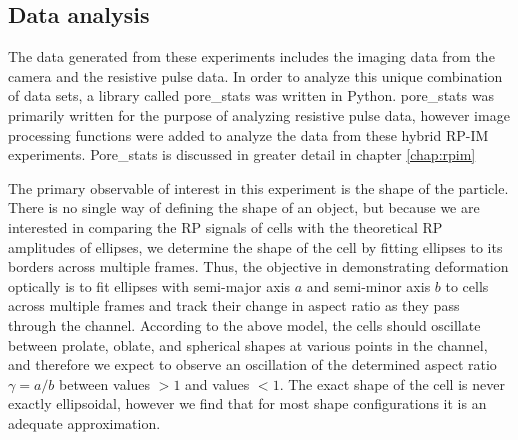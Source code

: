 		
		
		\subsection{Data analysis}
			
			The data generated from these experiments includes the imaging data from the camera and the resistive pulse data. In order to analyze this unique combination of data sets, a library called pore\_stats was written in Python. pore\_stats was primarily written for the purpose of analyzing resistive pulse data, however image processing functions were added to analyze the data from these hybrid RP-IM experiments. Pore\_stats is discussed in greater detail in chapter \ref{chap:rpim}
			
			The primary observable of interest in this experiment is the shape of the particle. There is no single way of defining the shape of an object, but because we are interested in comparing the RP signals of cells with the theoretical RP amplitudes of ellipses, we determine the shape of the cell by fitting ellipses to its borders across multiple frames. Thus, the objective in demonstrating deformation optically is to fit ellipses with semi-major axis $a$ and semi-minor axis $b$ to cells across multiple frames and track their change in aspect ratio as they pass through the channel. According to the above model, the cells should oscillate between prolate, oblate, and spherical shapes at various points in the channel, and therefore we expect to observe an oscillation of the determined aspect ratio $\gamma=a/b$ between values $>1$ and values $<1$. The exact shape of the cell is never exactly ellipsoidal, however we find that for most shape configurations it is an adequate approximation.
			
